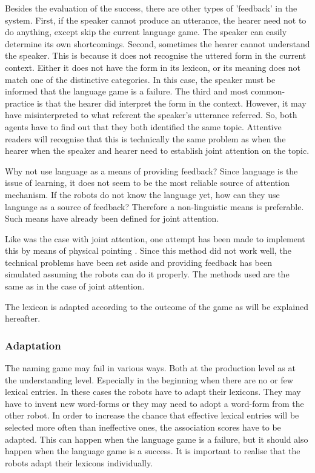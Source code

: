 Besides the evaluation of the success, there are other types of 'feedback' in the system. First, if the speaker cannot produce an utterance, the hearer need not to do anything, except skip the current language game. The speaker can easily determine its own shortcomings. Second, sometimes the hearer cannot understand the speaker. This is because it does not recognise the uttered form in the current context. Either it does not have the form in its lexicon, or its meaning does not match one of the distinctive categories. In this case, the speaker must be informed that the language game is a failure. The third and most common-practice is that the hearer did interpret the form in the context. However, it may have misinterpreted to what referent the speaker's utterance referred. So, both agents have to find out that they both identified the same topic. Attentive readers will recognise that this is technically the same problem as when the hearer when the speaker and hearer need to establish joint attention on the topic.

Why not use language as a means of providing feedback? Since language is the issue of learning, it does not seem to be the most reliable source of attention mechanism.  If the robots do not know the language yet, how can they use language as a source of feedback? Therefore a non-linguistic means is preferable. Such means have already been defined for joint attention.


Like was the case with joint attention, one attempt has been made to implement this by means of physical pointing \citep{vogt:1998b}. Since this method did not work well, the technical problems have been set aside and providing feedback has been simulated assuming the robots can do it properly. The methods used are the same as in the case of joint attention.


The lexicon is adapted according to the outcome of the game as will be explained hereafter.

\subsubsection{Adaptation}

The naming game may fail in various ways. Both at the production level as at the understanding level. Especially in the beginning when there are no or few lexical entries. In these cases the robots have to adapt their lexicons. They may have to invent new word-forms or they may need to adopt a word-form from the other robot. In order to increase the chance that effective lexical entries will be selected more often than ineffective ones, the association scores have to be adapted. This can happen when the language game is a failure, but it should also happen when the language game is a success. It is important to realise that the robots adapt their lexicons individually.


